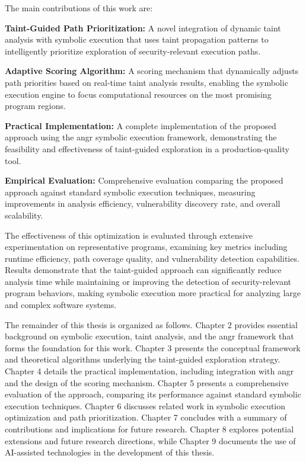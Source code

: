 The main contributions of this work are:

\textbf{Taint-Guided Path Prioritization:} A novel integration of dynamic taint analysis with symbolic execution that uses taint propagation patterns to intelligently prioritize exploration of security-relevant execution paths.

\textbf{Adaptive Scoring Algorithm:} A scoring mechanism that dynamically adjusts path priorities based on real-time taint analysis results, enabling the symbolic execution engine to focus computational resources on the most promising program regions.

\textbf{Practical Implementation:} A complete implementation of the proposed approach using the angr symbolic execution framework, demonstrating the feasibility and effectiveness of taint-guided exploration in a production-quality tool.

\textbf{Empirical Evaluation:} Comprehensive evaluation comparing the proposed approach against standard symbolic execution techniques, measuring improvements in analysis efficiency, vulnerability discovery rate, and overall scalability.

The effectiveness of this optimization is evaluated through extensive experimentation on representative programs, examining key metrics including runtime efficiency, path coverage quality, and vulnerability detection capabilities. Results demonstrate that the taint-guided approach can significantly reduce analysis time while maintaining or improving the detection of security-relevant program behaviors, making symbolic execution more practical for analyzing large and complex software systems.

The remainder of this thesis is organized as follows. Chapter 2 provides essential background on symbolic execution, taint analysis, and the angr framework that forms the foundation for this work. Chapter 3 presents the conceptual framework and theoretical algorithms underlying the taint-guided exploration strategy. Chapter 4 details the practical implementation, including integration with angr and the design of the scoring mechanism. Chapter 5 presents a comprehensive evaluation of the approach, comparing its performance against standard symbolic execution techniques. Chapter 6 discusses related work in symbolic execution optimization and path prioritization. Chapter 7 concludes with a summary of contributions and implications for future research. Chapter 8 explores potential extensions and future research directions, while Chapter 9 documents the use of AI-assisted technologies in the development of this thesis.

